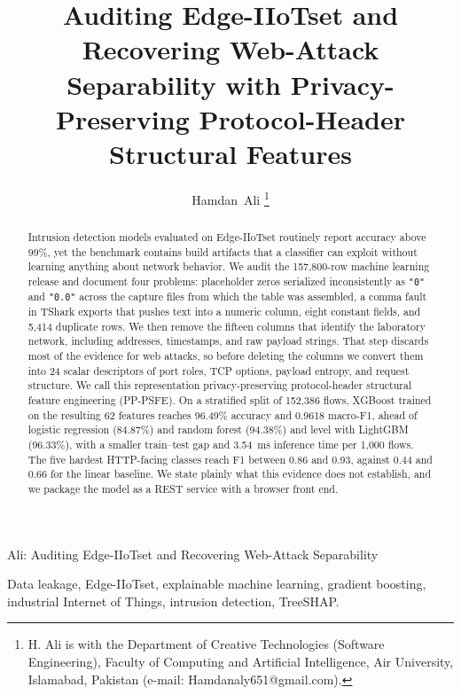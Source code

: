 \documentclass[journal]{IEEEtran}
\newcommand{\zero}{\texttt{"0"}}
\newcommand{\zerof}{\texttt{"0.0"}}
\begin{document}
\title{Auditing Edge-IIoTset and Recovering Web-Attack Separability with Privacy-Preserving Protocol-Header Structural Features}

\author{Hamdan~Ali%
\thanks{H. Ali is with the Department of Creative Technologies (Software Engineering), Faculty of Computing and Artificial Intelligence, Air University, Islamabad, Pakistan (e-mail: Hamdanaly651@gmail.com).}}

%
{Ali: Auditing Edge-IIoTset and Recovering Web-Attack Separability}

\maketitle

\begin{abstract}
Intrusion detection models evaluated on Edge-IIoTset routinely report accuracy above 99\%, yet the benchmark contains build artifacts that a classifier can exploit without learning anything about network behavior. We audit the 157,800-row machine learning release and document four problems: placeholder zeros serialized inconsistently as \zero{} and \zerof{} across the capture files from which the table was assembled, a comma fault in TShark exports that pushes text into a numeric column, eight constant fields, and 5,414 duplicate rows. We then remove the fifteen columns that identify the laboratory network, including addresses, timestamps, and raw payload strings. That step discards most of the evidence for web attacks, so before deleting the columns we convert them into 24 scalar descriptors of port roles, TCP options, payload entropy, and request structure. We call this representation privacy-preserving protocol-header structural feature engineering (PP-PSFE). On a stratified split of 152,386 flows, XGBoost trained on the resulting 62 features reaches 96.49\% accuracy and 0.9618 macro-F1, ahead of logistic regression (84.87\%) and random forest (94.38\%) and level with LightGBM (96.33\%), with a smaller train--test gap and 3.54~ms inference time per 1,000 flows. The five hardest HTTP-facing classes reach F1 between 0.86 and 0.93, against 0.44 and 0.66 for the linear baseline. We state plainly what this evidence does not establish, and we package the model as a REST service with a browser front end.
\end{abstract}

\begin{IEEEkeywords}
Data leakage, Edge-IIoTset, explainable machine learning, gradient boosting, industrial Internet of Things, intrusion detection, TreeSHAP.
\end{IEEEkeywords}
\end{document}
